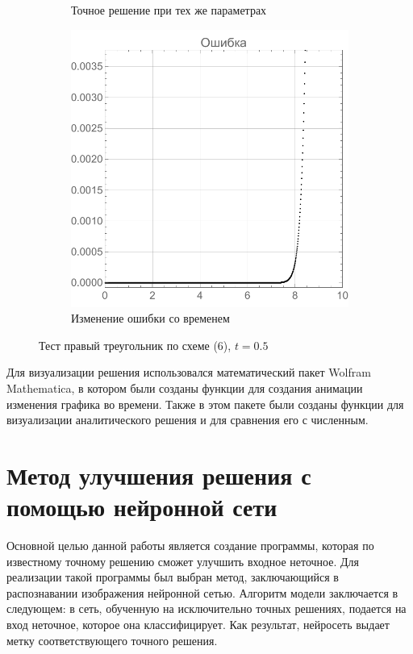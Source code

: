 \documentclass[12pt, a4paper]{article}
\begin{document}
\begin{figure}[!hp]
\begin{subfigure}[t]{0.32\textwidth}
		\caption{Точное решение при тех же параметрах}
		\label{test2}
	\end{subfigure}
	\hfill
	\begin{subfigure}[t]{0.32\textwidth}
		\centering
		\includegraphics[width=\textwidth]{res5_3}
		\caption{Изменение ошибки со временем}
		\label{test3}
	\end{subfigure}
	\caption{Тест правый треугольник по схеме  (6), $ t = 0.5$}
\end{figure}

 Для визуализации решения использовался математический пакет Wolfram Mathematica, в котором были созданы функции для создания анимации изменения графика во времени. Также в этом пакете были созданы функции для визуализации аналитического решения и для сравнения его с численным.


\section{Метод улучшения решения с помощью нейронной сети}

Основной целью данной работы является создание программы, которая по известному точному решению сможет улучшить входное неточное. Для реализации такой программы был выбран метод, заключающийся в распознавании изображения нейронной сетью. Алгоритм модели заключается в следующем: в сеть, обученную на исключительно точных решениях, подается на вход неточное, которое она классифицирует. Как результат, нейросеть выдает метку соответствующего точного решения.
\end{document}
